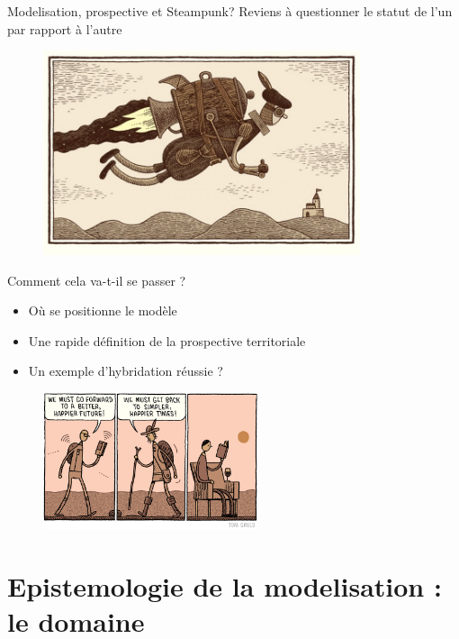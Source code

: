 \documentclass[newPxFont]{beamer}
\begin{document}
\begin{frame}[c]{Modelisation, prospective et Steampunk?}
  \vspace{-1cm}
  Reviens à questionner le statut de l'un par rapport à l'autre
  \begin{figure}
    \includegraphics[height=6cm]{img/a_Tom-Gauld-jetpack.jpg}
  \end{figure}
\end{frame}

\begin{frame}[c]{Comment cela va-t-il se passer ?}
  \vspace{-1cm}
  \begin{itemize}
    \item Où se positionne le modèle
    \item Une rapide définition de la prospective territoriale
    \item Un exemple d'hybridation réussie ?
  \end{itemize}

  \begin{figure}
    \includegraphics[height=4cm]{./img/a_Tom-Gauld-walk.jpg}
  \end{figure}
\end{frame}

\section{Epistemologie de la modelisation : le domaine}

\end{document}
